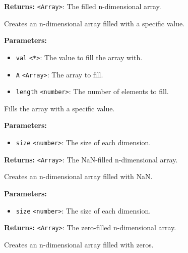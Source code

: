\documentclass[12pt,a4paper]{article}
\begin{document}
\noindent \textbf{Returns:} \texttt{<Array>}: The filled n-dimensional array.

\noindent Creates an n-dimensional array filled with a specific value.

\vspace{5mm}
\noindent {}


\noindent \textbf{Parameters:}
\begin{itemize}
  \item \texttt{val} \texttt{<*>}: The value to fill the array with.
  \item \texttt{A} \texttt{<Array>}: The array to fill.
  \item \texttt{length} \texttt{<number>}: The number of elements to fill.
\end{itemize}

\noindent Fills the array with a specific value.

\vspace{5mm}
\noindent {}


\noindent \textbf{Parameters:}
\begin{itemize}
  \item \texttt{size} \texttt{<number>}: The size of each dimension.
\end{itemize}

\noindent \textbf{Returns:} \texttt{<Array>}: The NaN-filled n-dimensional array.

\noindent Creates an n-dimensional array filled with NaN.

\vspace{5mm}
\noindent {}


\noindent \textbf{Parameters:}
\begin{itemize}
  \item \texttt{size} \texttt{<number>}: The size of each dimension.
\end{itemize}

\noindent \textbf{Returns:} \texttt{<Array>}: The zero-filled n-dimensional array.

\noindent Creates an n-dimensional array filled with zeros.
\end{document}
